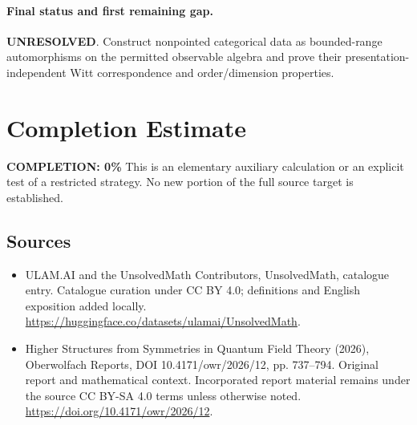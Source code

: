 \documentclass[11pt]{article}
\begin{document}
\paragraph{Final status and first remaining gap.}
\textbf{UNRESOLVED}. Construct nonpointed categorical data as bounded-range automorphisms on the permitted observable algebra and prove their presentation-independent Witt correspondence and order/dimension properties.

\section{Completion Estimate}
\noindent\textbf{COMPLETION: 0\%}
This is an elementary auxiliary calculation or an explicit test of a restricted strategy. No new portion of the full source target is established.

\subsection{Sources}
\begin{itemize}
\item[\hypertarget{source:statement:1}{S1}] ULAM.AI and the UnsolvedMath Contributors, UnsolvedMath, catalogue entry. Catalogue curation under CC BY 4.0; definitions and English exposition added locally.
\url{https://huggingface.co/datasets/ulamai/UnsolvedMath}.
\item[\hypertarget{source:statement:2}{S2}] Higher Structures from Symmetries in Quantum Field Theory (2026), Oberwolfach Reports, DOI 10.4171/owr/2026/12, pp. 737--794. Original report and mathematical context. Incorporated report material remains under the source CC BY-SA 4.0 terms unless otherwise noted.
\url{https://doi.org/10.4171/owr/2026/12}.
\end{itemize}
\label{end:statement}
\end{document}
